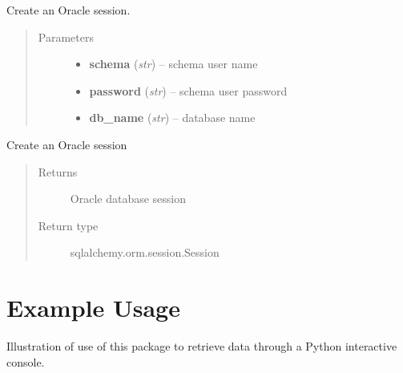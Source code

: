 \documentclass[letterpaper,10pt,english]{sphinxmanual}
\begin{document}
\begin{fulllineitems}
\label{modules:webb_utils.db_utils.AlchemDB}
Create an Oracle session.
\begin{quote}\begin{description}
\item[{Parameters}] \leavevmode\begin{itemize}
\item {} 
\textbf{schema} (\emph{str}) -- schema user name

\item {} 
\textbf{password} (\emph{str}) -- schema user password

\item {} 
\textbf{db\_name} (\emph{str}) -- database name

\end{itemize}

\end{description}\end{quote}

\begin{fulllineitems}
\label{modules:webb_utils.db_utils.AlchemDB.create_session}
Create an Oracle session
\begin{quote}\begin{description}
\item[{Returns}] \leavevmode
Oracle database session

\item[{Return type}] \leavevmode
sqlalchemy.orm.session.Session

\end{description}\end{quote}

\end{fulllineitems}


\end{fulllineitems}



\chapter{Example Usage}
\label{example_usage:example-usage}\label{example_usage::doc}
Illustration of use of this package to retrieve data through
a Python interactive console.
\end{document}
